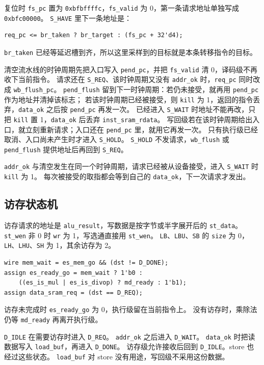 \documentclass{article}
\begin{document}
复位时 \texttt{fs\_pc} 置为 \texttt{0xbfbffffc}，\texttt{fs\_valid} 为 0，第一条请求地址单独写成 \texttt{0xbfc00000}。
\texttt{S\_HAVE} 里下一条地址是：
\begin{verbatim}
req_pc <= br_taken ? br_target : (fs_pc + 32'd4);
\end{verbatim}
\texttt{br\_taken} 已经等延迟槽到齐，所以这里采样到的目标就是本条转移指令的目标。

清空流水线的时钟周期先把入口写入 \texttt{pend\_pc}，并把 \texttt{fs\_valid} 清 0，译码级不再收下当前指令。
请求还在 \texttt{S\_REQ}、该时钟周期又没有 \texttt{addr\_ok} 时，\texttt{req\_pc} 同时改成 \texttt{wb\_flush\_pc}。
\texttt{pend\_flush} 留到下一时钟周期：若仍未接受，就再用 \texttt{pend\_pc} 作为地址并清掉该标志；
若该时钟周期已经被接受，则 \texttt{kill} 为 1，返回的指令丢弃，\texttt{data\_ok} 之后按 \texttt{pend\_pc} 再发一次。
已经进入 \texttt{S\_WAIT} 时地址不能再改，只把 \texttt{kill} 置 1，\texttt{data\_ok} 后丢弃 \texttt{inst\_sram\_rdata}。
写回级若在该时钟周期给出入口，就立刻重新请求；入口还在 \texttt{pend\_pc} 里，就用它再发一次。
只有执行级已经取消、入口尚未产生时才进入 \texttt{S\_HOLD}。
\texttt{S\_HOLD} 不发请求，\texttt{wb\_flush} 或 \texttt{pend\_flush} 提供地址后再回到 \texttt{S\_REQ}。

\texttt{addr\_ok} 与清空发生在同一个时钟周期，请求已经被从设备接受，进入 \texttt{S\_WAIT} 时 \texttt{kill} 为 1。
每次被接受的取指都会等到自己的 \texttt{data\_ok}，下一次请求才发出。

\subsection{访存状态机}
访存请求的地址是 \texttt{alu\_result}，写数据是按字节或半字展开后的 \texttt{st\_data}。
\texttt{st\_wen} 非 0 时 \texttt{wr} 为 1，写选通直接用 \texttt{st\_wen}。
\texttt{LB}、\texttt{LBU}、\texttt{SB} 的 \texttt{size} 为 0，\texttt{LH}、\texttt{LHU}、\texttt{SH} 为 1，其余访存为 2。
\begin{verbatim}
wire mem_wait = es_mem_go && (dst != D_DONE);
assign es_ready_go = mem_wait ? 1'b0 :
    ((es_is_mul | es_is_divop) ? md_ready : 1'b1);
assign data_sram_req = (dst == D_REQ);
\end{verbatim}
访存未完成时 \texttt{es\_ready\_go} 为 0，执行级留在当前指令上。
没有访存时，乘除法仍等 \texttt{md\_ready} 再离开执行级。

\texttt{D\_IDLE} 在需要访存时进入 \texttt{D\_REQ}。
\texttt{addr\_ok} 之后进入 \texttt{D\_WAIT}。
\texttt{data\_ok} 时把读数据写入 \texttt{load\_buf}，再进入 \texttt{D\_DONE}。
访存级允许接收后回到 \texttt{D\_IDLE}。store 也经过这些状态。
\texttt{load\_buf} 对 store 没有用途，写回级不采用这份数据。
\end{document}
